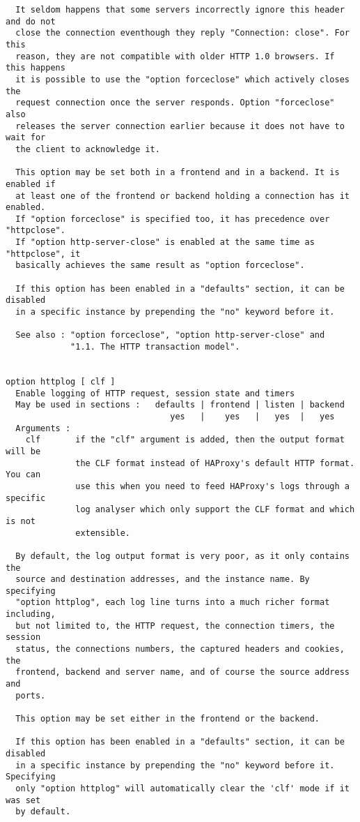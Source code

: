 \begin{verbatim}
  It seldom happens that some servers incorrectly ignore this header and do not
  close the connection eventhough they reply "Connection: close". For this
  reason, they are not compatible with older HTTP 1.0 browsers. If this happens
  it is possible to use the "option forceclose" which actively closes the
  request connection once the server responds. Option "forceclose" also
  releases the server connection earlier because it does not have to wait for
  the client to acknowledge it.

  This option may be set both in a frontend and in a backend. It is enabled if
  at least one of the frontend or backend holding a connection has it enabled.
  If "option forceclose" is specified too, it has precedence over "httpclose".
  If "option http-server-close" is enabled at the same time as "httpclose", it
  basically achieves the same result as "option forceclose".

  If this option has been enabled in a "defaults" section, it can be disabled
  in a specific instance by prepending the "no" keyword before it.

  See also : "option forceclose", "option http-server-close" and
             "1.1. The HTTP transaction model".


option httplog [ clf ]
  Enable logging of HTTP request, session state and timers
  May be used in sections :   defaults | frontend | listen | backend
                                 yes   |    yes   |   yes  |   yes
  Arguments :
    clf       if the "clf" argument is added, then the output format will be
              the CLF format instead of HAProxy's default HTTP format. You can
              use this when you need to feed HAProxy's logs through a specific
              log analyser which only support the CLF format and which is not
              extensible.

  By default, the log output format is very poor, as it only contains the
  source and destination addresses, and the instance name. By specifying
  "option httplog", each log line turns into a much richer format including,
  but not limited to, the HTTP request, the connection timers, the session
  status, the connections numbers, the captured headers and cookies, the
  frontend, backend and server name, and of course the source address and
  ports.

  This option may be set either in the frontend or the backend.

  If this option has been enabled in a "defaults" section, it can be disabled
  in a specific instance by prepending the "no" keyword before it. Specifying
  only "option httplog" will automatically clear the 'clf' mode if it was set
  by default.


\end{verbatim}
